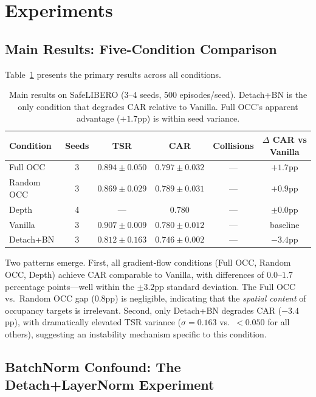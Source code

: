 \documentclass[10pt,letterpaper]{article}
\begin{document}
\section{Experiments}

\subsection{Main Results: Five-Condition Comparison}

Table~\ref{tab:main} presents the primary results across all conditions.

\begin{table}[h]
\centering
\caption{Main results on SafeLIBERO (3--4 seeds, 500 episodes/seed). Detach+BN is the only condition that degrades CAR relative to Vanilla. Full OCC's apparent advantage ($+1.7$pp) is within seed variance.}
\label{tab:main}
\begin{tabular}{lccccc}
\toprule
\textbf{Condition} & \textbf{Seeds} & \textbf{TSR} & \textbf{CAR} & \textbf{Collisions} & \textbf{$\Delta$ CAR vs Vanilla} \\
\midrule
Full OCC   & 3 & $0.894 \pm 0.050$ & $0.797 \pm 0.032$ & --- & $+1.7$pp \\
Random OCC & 3 & $0.869 \pm 0.029$ & $0.789 \pm 0.031$ & --- & $+0.9$pp \\
Depth      & 4 & ---               & $0.780$           & --- & $\pm 0.0$pp \\
Vanilla    & 3 & $0.907 \pm 0.009$ & $0.780 \pm 0.012$ & --- & baseline \\
Detach+BN  & 3 & $0.812 \pm 0.163$ & $0.746 \pm 0.002$ & --- & $-3.4$pp \\
\bottomrule
\end{tabular}
\end{table}

Two patterns emerge. First, all gradient-flow conditions (Full OCC, Random OCC, Depth) achieve CAR comparable to Vanilla, with differences of $0.0$--$1.7$ percentage points---well within the $\pm 3.2$pp standard deviation. The Full OCC vs.\ Random OCC gap ($0.8$pp) is negligible, indicating that the \emph{spatial content} of occupancy targets is irrelevant. Second, only Detach+BN degrades CAR ($-3.4$pp), with dramatically elevated TSR variance ($\sigma = 0.163$ vs.\ $< 0.050$ for all others), suggesting an instability mechanism specific to this condition.

\subsection{BatchNorm Confound: The Detach+LayerNorm Experiment}
\label{sec:bn_confound}
\end{document}
